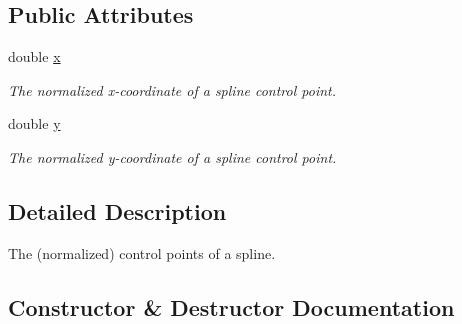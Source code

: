 \subsection*{Public Attributes}
\begin{DoxyCompactItemize}
\item 
\mbox{\label{structlib_c_z_i_1_1_i_display_settings_1_1_spline_control_point_a1978764701b7179c6e5fd045dc88fe9a}} 
double \hyperlink{structlib_c_z_i_1_1_i_display_settings_1_1_spline_control_point_a1978764701b7179c6e5fd045dc88fe9a}{x}
\begin{DoxyCompactList}\small\item\em The normalized x-\/coordinate of a spline control point. \end{DoxyCompactList}\item 
\mbox{\label{structlib_c_z_i_1_1_i_display_settings_1_1_spline_control_point_a3cce749fa57f428f61d93f55c617becb}} 
double \hyperlink{structlib_c_z_i_1_1_i_display_settings_1_1_spline_control_point_a3cce749fa57f428f61d93f55c617becb}{y}
\begin{DoxyCompactList}\small\item\em The normalized y-\/coordinate of a spline control point. \end{DoxyCompactList}\end{DoxyCompactItemize}


\subsection{Detailed Description}
The (normalized) control points of a spline. 

\subsection{Constructor \& Destructor Documentation}
\mbox{\label{structlib_c_z_i_1_1_i_display_settings_1_1_spline_control_point_a0e35162e74f26a816a5e75443209b559}} 
